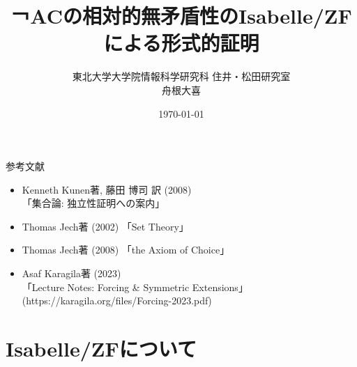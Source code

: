 \documentclass[17pt,aspectratio=169]{beamer}
\title{￢ACの相対的無矛盾性のIsabelle/ZFによる形式的証明}
\author{東北大学大学院情報科学研究科 住井・松田研究室 \\ 舟根大喜}
\date{\today}
\begin{document}
\maketitle

\begin{frame} {参考文献} 
      
    {\small
        \begin{itemize}[itemsep=5pt]
            \item Kenneth Kunen著, 藤田 博司 訳 (2008) \\「集合論: 独立性証明への案内」
            \item Thomas Jech著 (2002) 「Set Theory」
            \item Thomas Jech著 (2008) 「the Axiom of Choice」
            \item Asaf Karagila著 (2023) \\ 「Lecture Notes: Forcing \& Symmetric Extensions」 \\
                  {\small (https://karagila.org/files/Forcing-2023.pdf) }
        \end{itemize}}
\end{frame}

\section{Isabelle/ZFについて}
\end{document}
